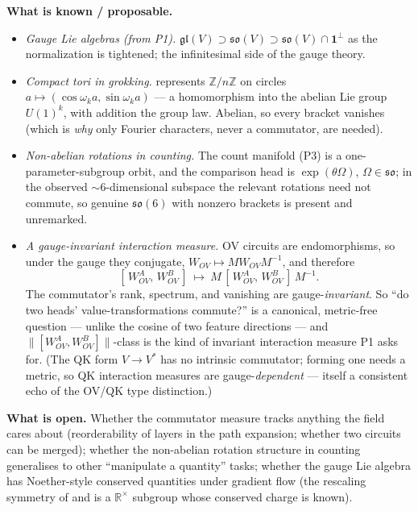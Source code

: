 \textbf{What is known / proposable.}
\begin{itemize}
\item \emph{Gauge Lie algebras (from P1).} $\mathfrak{gl}(V)\supset\mathfrak{so}(V)\supset
  \mathfrak{so}(V)\cap\mathbf 1^{\perp}$ as the normalization is tightened; the infinitesimal side
  of the gauge theory.
\item \emph{Compact tori in grokking.} \textcite{progress-measures-for-grokking} represents
  $\mathbb{Z}/n\mathbb{Z}$ on circles $a\mapsto(\cos\omega_k a,\sin\omega_k a)$ --- a homomorphism
  into the abelian Lie group $U(1)^{k}$, with addition the group law. Abelian, so every bracket
  vanishes (which is \emph{why} only Fourier characters, never a commutator, are needed).
\item \emph{Non-abelian rotations in counting.} The count manifold (P3) is a one-parameter-subgroup
  orbit, and the comparison head is $\exp(\theta\Omega)$, $\Omega\in\mathfrak{so}$; in the
  observed $\sim 6$-dimensional subspace the relevant rotations need not commute, so genuine
  $\mathfrak{so}(6)$ with nonzero brackets is present and unremarked.
\item \emph{A gauge-invariant interaction measure.} OV circuits are endomorphisms, so under the
  gauge they conjugate, $W_{OV}\mapsto MW_{OV}M^{-1}$, and therefore
  \[
  [\,W_{OV}^{A},\,W_{OV}^{B}\,]\ \longmapsto\ M\,[\,W_{OV}^{A},\,W_{OV}^{B}\,]\,M^{-1}.
  \]
  The commutator's rank, spectrum, and vanishing are gauge-\emph{invariant}. So ``do two heads'
  value-transformations commute?'' is a canonical, metric-free question --- unlike the cosine of
  two feature directions --- and $\lVert[W_{OV}^{A},W_{OV}^{B}]\rVert$-class is the kind of
  invariant interaction measure P1 asks for. (The QK form $V\to V^{*}$ has no intrinsic
  commutator; forming one needs a metric, so QK interaction measures are gauge-\emph{dependent} ---
  itself a consistent echo of the OV/QK type distinction.)
\end{itemize}

\textbf{What is open.} Whether the commutator measure tracks anything the field cares about
(reorderability of layers in the path expansion; whether two circuits can be merged); whether the
non-abelian rotation structure in counting generalises to other ``manipulate a quantity'' tasks;
whether the gauge Lie algebra has Noether-style conserved quantities under gradient flow (the
rescaling symmetry of \textcite{toy-models-superposition} and \textcite{softmax-linear-units} is a
$\mathbb{R}^{\times}$ subgroup whose conserved charge is known).

